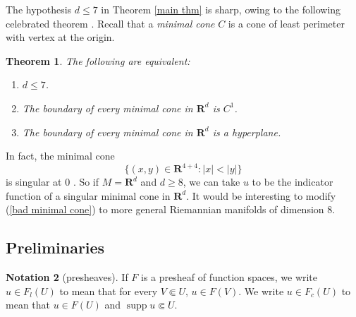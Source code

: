 \documentclass[reqno,12pt,letterpaper]{amsart}
\newcommand{\NN}{\mathbf{N}}
\newcommand{\RR}{\mathbf{R}}
\newcommand{\Hyp}{\mathbf H}
\DeclareMathOperator{\supp}{supp}
\newcommand{\dfn}[1]{\emph{#1}\index{#1}}
\newtheorem{theorem}{Theorem}[section]
\theoremstyle{definition}
\newtheorem{example}[theorem]{Example}
\newtheorem{notation}[theorem]{Notation}
\numberwithin{equation}{section}
\begin{document}
%

The hypothesis $d \leq 7$ in Theorem \ref{main thm} is sharp, owing to the following celebrated theorem \cite[Theorem 6.2.2]{Simons68} \cite[Theorem A]{BOMBIERI1969}.
Recall that a \dfn{minimal cone} $C$ is a cone of least perimeter with vertex at the origin.

\begin{theorem}\label{minimal cones in R8}
The following are equivalent:
\begin{enumerate}
\item $d \leq 7$.
\item The boundary of every minimal cone in $\RR^d$ is $C^1$.
\item The boundary of every minimal cone in $\RR^d$ is a hyperplane.
\end{enumerate}
\end{theorem}

In fact, the minimal cone
\begin{equation}\label{bad minimal cone}
\{(x, y) \in \RR^{4 + 4}: |x| < |y|\}
\end{equation}
is singular at $0$ \cite[Theorem A]{BOMBIERI1969}.
So if $M = \RR^d$ and $d \geq 8$, we can take $u$ to be the indicator function of a singular minimal cone in $\RR^d$.
It would be interesting to modify (\ref{bad minimal cone}) to more general Riemannian manifolds of dimension $8$.



\subsection{Preliminaries}
\begin{notation}[presheaves]
If $F$ is a presheaf of function spaces, we write $u \in F_l(U)$ to mean that for every $V \Subset U$, $u \in F(V)$.
We write $u \in F_c(U)$ to mean that $u \in F(U)$ and $\supp u \Subset U$.
\end{notation}
\end{document}
